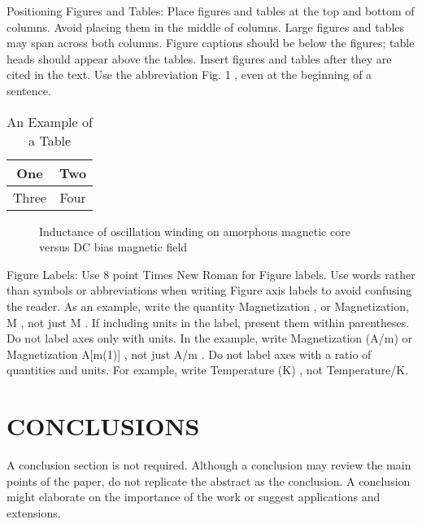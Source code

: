 \documentclass[letterpaper, 10 pt, conference]{ieeeconf}  %
\begin{document}
Positioning Figures and Tables: Place figures and tables at the top and bottom of columns. Avoid placing them in the middle of columns. Large figures and tables may span across both columns. Figure captions should be below the figures; table heads should appear above the tables. Insert figures and tables after they are cited in the text. Use the abbreviation  Fig. 1 , even at the beginning of a sentence.

\begin{table}[h]
\caption{An Example of a Table}
\label{table_example}
\begin{center}
\begin{tabular}{|c||c|}
\hline
One & Two\\
\hline
Three & Four\\
\hline
\end{tabular}
\end{center}
\end{table}


   \begin{figure}[thpb]
      \centering
      \caption{Inductance of oscillation winding on amorphous
       magnetic core versus DC bias magnetic field}
      \label{figurelabel}
   \end{figure}
   

Figure Labels: Use 8 point Times New Roman for Figure labels. Use words rather than symbols or abbreviations when writing Figure axis labels to avoid confusing the reader. As an example, write the quantity  Magnetization , or  Magnetization, M , not just  M . If including units in the label, present them within parentheses. Do not label axes only with units. In the example, write  Magnetization (A/m)  or  Magnetization {A[m(1)]} , not just  A/m . Do not label axes with a ratio of quantities and units. For example, write  Temperature (K) , not  Temperature/K. 

\section{CONCLUSIONS}

A conclusion section is not required. Although a conclusion may review the main points of the paper, do not replicate the abstract as the conclusion. A conclusion might elaborate on the importance of the work or suggest applications and extensions. 
\end{document}
